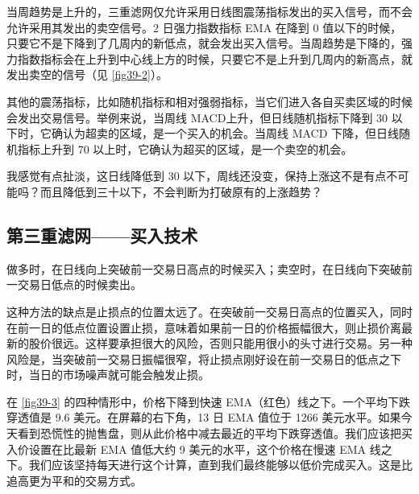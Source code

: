 当周趋势是上升的，三重滤网仅允许采用日线图震荡指标发出的买入信号，而不会允许采用其发出的卖空信号。2 日强力指数指标 EMA 在降到 0 值以下的时候，只要它不是下降到了几周内的新低点，就会发出买入信号。当周趋势是下降的，强力指数指标会在上升到中心线上方的时候，只要它不是上升到几周内的新高点，就发出卖空的信号（见 \autoref{fig39-2}）。


其他的震荡指标，比如随机指标和相对强弱指标，当它们进入各自买卖区域的时候会发出交易信号。举例来说，当周线 MACD上升，但日线随机指标下降到 30 以下时，它确认为超卖的区域，是一个买入的机会。当周线 MACD 下降，但日线随机指标上升到 70 以上时，它确认为超买的区域，是一个卖空的机会。
\begin{tcolorbox}
    我感觉有点扯淡，这日线降低到 30 以下，周线还没变，保持上涨这不是有点不可能吗？而且降低到三十以下，不会判断为打破原有的上涨趋势？
\end{tcolorbox}
\subsection*{第三重滤网——买入技术}
做多时，在日线向上突破前一交易日高点的时候买入；卖空时，在日线向下突破前一交易日低点的时候卖出。

这种方法的缺点是止损点的位置太远了。在突破前一交易日高点的位置买入，同时在前一日的低点位置设置止损，意味着如果前一日的价格振幅很大，则止损价离最新的股价很远。这样要承担很大的风险，否则只能用很小的头寸进行交易。另一种风险是，当突破前一交易日振幅很窄，将止损点刚好设在前一交易日的低点之下时，当日的市场噪声就可能会触发止损。

在 \autoref{fig39-3} 的四种情形中，价格下降到快速 EMA（红色）线之下。一个平均下跌穿透值是 9.6 美元。在屏幕的右下角，13 日 EMA 值位于 1266 美元水平。如果今天看到恐慌性的抛售盘，则从此价格中减去最近的平均下跌穿透值。我们应该把买入价设置在比最新 EMA 值低大约 9 美元的水平，这个价格在慢速 EMA 线之下。我们应该坚持每天进行这个计算，直到我们最终能够以低价完成买入。这是比追高更为平和的交易方式。
